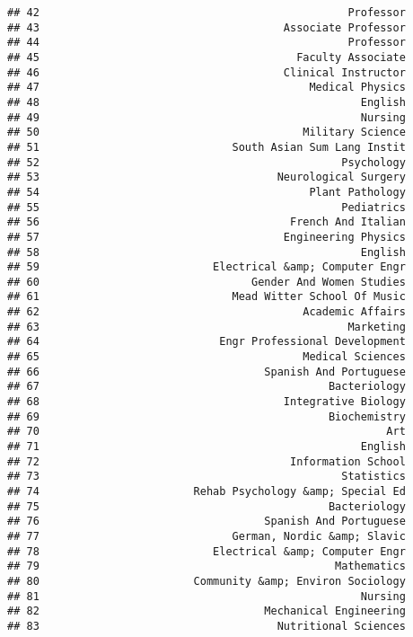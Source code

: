 \documentclass[
]{article}
\begin{document}
\begin{verbatim}
## 42                                                Professor
## 43                                      Associate Professor
## 44                                                Professor
## 45                                        Faculty Associate
## 46                                      Clinical Instructor
## 47                                          Medical Physics
## 48                                                  English
## 49                                                  Nursing
## 50                                         Military Science
## 51                              South Asian Sum Lang Instit
## 52                                               Psychology
## 53                                     Neurological Surgery
## 54                                          Plant Pathology
## 55                                               Pediatrics
## 56                                       French And Italian
## 57                                      Engineering Physics
## 58                                                  English
## 59                           Electrical &amp; Computer Engr
## 60                                 Gender And Women Studies
## 61                              Mead Witter School Of Music
## 62                                         Academic Affairs
## 63                                                Marketing
## 64                            Engr Professional Development
## 65                                         Medical Sciences
## 66                                   Spanish And Portuguese
## 67                                             Bacteriology
## 68                                      Integrative Biology
## 69                                             Biochemistry
## 70                                                      Art
## 71                                                  English
## 72                                       Information School
## 73                                               Statistics
## 74                        Rehab Psychology &amp; Special Ed
## 75                                             Bacteriology
## 76                                   Spanish And Portuguese
## 77                              German, Nordic &amp; Slavic
## 78                           Electrical &amp; Computer Engr
## 79                                              Mathematics
## 80                        Community &amp; Environ Sociology
## 81                                                  Nursing
## 82                                   Mechanical Engineering
## 83                                     Nutritional Sciences

\end{verbatim}
\end{document}
